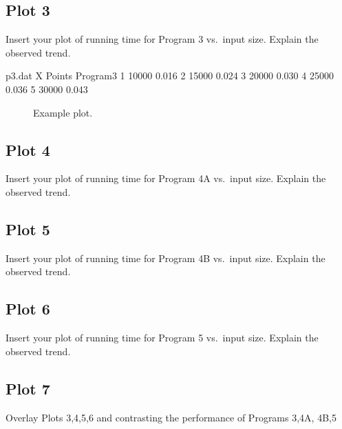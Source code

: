 \documentclass{article}
\begin{document}
\subsection{Plot 3}
{\color{red} Insert your plot of running time for Program 3 vs.\ input size. Explain the observed trend.}

\begin{filecontents}{p3.dat}
X   Points   Program3
1   10000    0.016
2   15000    0.024
3   20000    0.030
4   25000    0.036
5   30000    0.043
\end{filecontents}

\begin{figure}[H]
\centering
{}
\caption{Example plot.}
\label{plot1}
\end{figure}

\subsection{Plot 4}
{\color{red} Insert your plot of running time for Program 4A vs.\ input size. Explain the observed trend.}

\subsection{Plot 5}
{\color{red} Insert your plot of running time for Program 4B vs.\ input size. Explain the observed trend.}

\subsection{Plot 6}
{\color{red} Insert your plot of running time for Program 5 vs.\ input size. Explain the observed trend.}

\subsection{Plot 7}
{\color{red} Overlay Plots 3,4,5,6 and contrasting the performance of Programs 3,4A, 4B,5}
\end{document}
